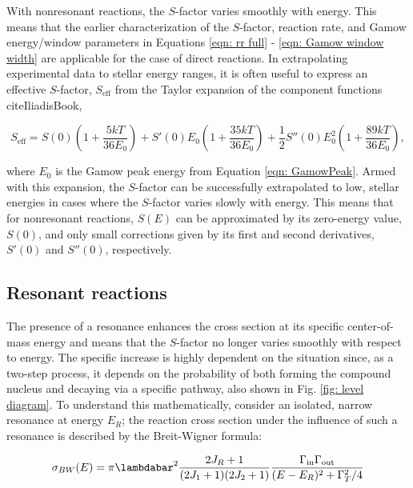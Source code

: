 With nonresonant reactions, the $S$-factor varies smoothly with energy. This means that the earlier characterization  of the $S$-factor, reaction rate, and Gamow energy/window parameters in Equations \ref{eqn: rr full} - 
\ref{eqn: Gamow window width} are applicable for the case of direct reactions. In extrapolating experimental data to stellar energy ranges, it is often useful to express an effective $S$-factor, $S_{\text{eff}}$ from the Taylor expansion of the component functions cite{IliadisBook},

\begin{equation}
S_{\text{eff}} = S(0) \left( 1 + \dfrac{5 k T}{36 E_{0}}   \right) + S'(0) E_{0} \left( 1 + \dfrac{35 k T}{36 E_{0}}   \right)  + \dfrac{1}{2} S''(0) E_{0}^{2} \left( 1 + \dfrac{89 k T}{36 E_{0}}   \right),
\label{eqn: Seff}
\end{equation}

\noindent where $E_{0}$ is the Gamow peak energy from Equation \ref{eqn: GamowPeak}. Armed with this expansion, the $S$-factor can be successfully extrapolated to low, stellar energies in cases where the $S$-factor varies slowly with energy. This means that for nonresonant reactions, $S(E)$ can be approximated by its zero-energy value, $S(0)$, and only small corrections given by its first and second derivatives, $S'(0)$ and $S''(0)$, respectively. 




\subsection{Resonant reactions}

The presence of a resonance enhances the cross section at its specific center-of-mass energy and means that the $S$-factor no longer varies smoothly with respect to energy. The specific increase is highly dependent on the situation since, as a two-step process, it depends on the probability of both forming the compound nucleus and decaying via a specific pathway, also shown in Fig. \ref{fig: level diagram}. To understand this mathematically, consider an isolated, narrow resonance at energy $E_{R}$; the reaction cross section under the influence of such a resonance is described by the Breit-Wigner formula:

\begin{equation}
\label{eqn: BreitWigner}
\sigma_{BW}(E) = \pi \lambdabar^{2} \frac{2J_R+1}{(2J_1+1)(2J_2+1)}\frac{\Gamma_\mathrm{in}\Gamma_\mathrm{out}}{(E-E_{R})^2+\Gamma_{T}^2/4}
\end{equation}


